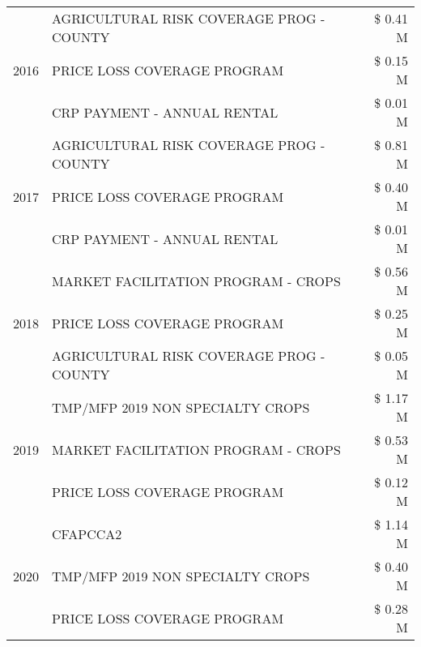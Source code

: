 \begin{tabular}{llr}
\multirow[t]{3}{*}{2016} & AGRICULTURAL RISK COVERAGE PROG - COUNTY & \$ 0.41 M \\
 & PRICE LOSS COVERAGE PROGRAM & \$ 0.15 M \\
 & CRP PAYMENT - ANNUAL RENTAL & \$ 0.01 M \\
\cline{1-3}
\multirow[t]{3}{*}{2017} & AGRICULTURAL RISK COVERAGE PROG - COUNTY & \$ 0.81 M \\
 & PRICE LOSS COVERAGE PROGRAM & \$ 0.40 M \\
 & CRP PAYMENT - ANNUAL RENTAL & \$ 0.01 M \\
\cline{1-3}
\multirow[t]{3}{*}{2018} & MARKET FACILITATION PROGRAM - CROPS & \$ 0.56 M \\
 & PRICE LOSS COVERAGE PROGRAM & \$ 0.25 M \\
 & AGRICULTURAL RISK COVERAGE PROG - COUNTY & \$ 0.05 M \\
\cline{1-3}
\multirow[t]{3}{*}{2019} & TMP/MFP 2019 NON SPECIALTY CROPS & \$ 1.17 M \\
 & MARKET FACILITATION PROGRAM - CROPS & \$ 0.53 M \\
 & PRICE LOSS COVERAGE PROGRAM & \$ 0.12 M \\
\cline{1-3}
\multirow[t]{3}{*}{2020} & CFAPCCA2 & \$ 1.14 M \\
 & TMP/MFP 2019 NON SPECIALTY CROPS & \$ 0.40 M \\
 & PRICE LOSS COVERAGE PROGRAM & \$ 0.28 M \\
\cline{1-3}
\bottomrule
\end{tabular}
